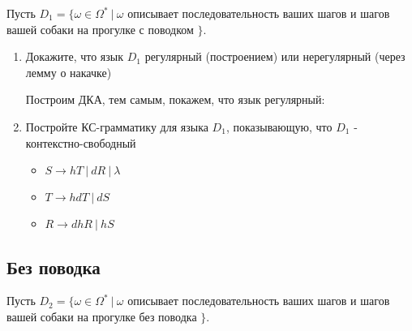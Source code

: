 \documentclass{article}
\begin{document}
        Пусть $D_1 = \{\omega \in \Omega^* \: | \: \omega$ описывает последовательность ваших шагов и шагов вашей собаки на прогулке с поводком $\}$.
 
        \begin{enumerate}
            \item Докажите, что язык $D_1$ регулярный (построением) или нерегулярный (через лемму о накачке)
 
            Построим ДКА, тем самым, покажем, что язык регулярный:
            \begin{center}
            \end{center}  
 
            \item Постройте КС-грамматику для языка $D_1$, показывающую, что $D_1$ - контекстно-свободный
 
                \begin{itemize}
                    \item $S \to hT \: | \: dR \: | \: \lambda$
 
                    \item $T \to hdT \: | \: dS$
 
                    \item $R \to dhR \: | \: hS$
                \end{itemize}
 
 
        \end{enumerate}
 
    \subsection{Без поводка}
 
        Пусть $D_2 = \{\omega \in \Omega^* \: | \: \omega$ описывает последовательность ваших шагов и шагов вашей собаки на прогулке без поводка $\}$.
 
\end{document}
